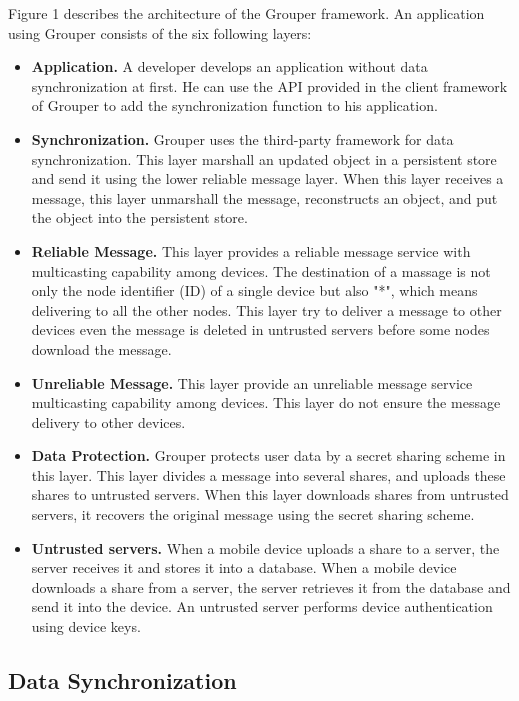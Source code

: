 \documentclass[twocolumn,10pt]{article}
\begin{document}
Figure 1 describes the architecture of the Grouper framework. 
An application using Grouper consists of the six following layers:

\begin{itemize}
	\setlength{\itemsep}{1pt}
	\setlength{\parskip}{0pt}
	\setlength{\parsep}{0pt}
	\item \textbf{Application.}
	A developer develops an application without data synchronization at first. 
	He can use the API provided in the client framework of Grouper to add the synchronization function to his application.
	\item \textbf{Synchronization.} 
	Grouper uses the third-party framework for data synchronization.
	This layer marshall an updated object in a persistent store and send it using the lower reliable message layer.
	When this layer receives a message, this layer unmarshall the message, reconstructs an object, and put the object into the persistent store.
	\item \textbf{Reliable Message.}
	This layer provides a reliable message service with multicasting capability among devices.
	The destination of a massage is not only the node identifier (ID) of a single device but also "*", which means delivering to all the other nodes.
	This layer try to deliver a message to other devices even the message is deleted in untrusted servers before some nodes download the message.
	\item \textbf{Unreliable Message.}
	This layer provide an unreliable message service multicasting capability among devices.
	This layer do not ensure the message delivery to other devices.
	\item \textbf{Data Protection.}
	Grouper protects user data by a secret sharing scheme in this layer.
	This layer divides a message into several shares, and uploads these shares to untrusted servers.
	When this layer downloads shares from untrusted servers, it recovers the original message using the secret sharing scheme.
	\item \textbf{Untrusted servers.}
	When a mobile device uploads a share to a server, the server receives it and stores it into a database.
	When a mobile device downloads a share from a server, the server retrieves it from the database and send it into the device.
	An untrusted server performs device authentication using device keys.
\end{itemize}

\subsection{Data Synchronization}
\end{document}
